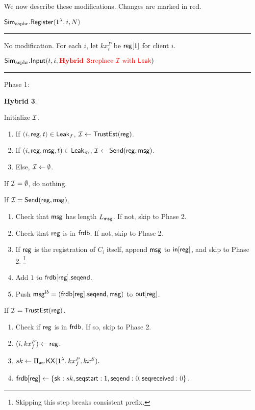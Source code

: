 We now describe these modifications. Changes are marked in red.

\vspace{10pt}

$\mathbf{\mathsf{Sim}_{\text{asphr}}.\mathsf{Register}}(1^{\lambda}, i, N)$
\vspace{5pt}
\hrule
\vspace{5pt}
No modification. For each $i$, let $kx^P_i$ be $\mathsf{reg}[1]$ for client $i$.
\vspace{10pt}

$\mathbf{\mathsf{Sim}_{\text{asphr}}.\mathsf{Input}}(t, i, {\color{red} \textbf{Hybrid 3:} \text{replace $\mathcal{I}$ with $\mathsf{Leak}$}})$
\vspace{5pt}
\hrule
\vspace{5pt}
Phase 1: 

{
\color{red} 

\textbf{Hybrid 3}:

Initialize $\mathcal{I}$.

\begin{enumerate}
    \item If $(i, \mathsf{reg}, t) \in \mathsf{Leak}_f$, $\mathcal{I} \leftarrow \mathsf{TrustEst}(\mathsf{reg})$.
    \item If $(i, \mathsf{reg}, \mathsf{msg}, t) \in \mathsf{Leak}_m$, $\mathcal{I} \leftarrow \mathsf{Send}(\mathsf{reg}, \mathsf{msg})$.
    \item Else, $\mathcal{I} \leftarrow \emptyset$.
\end{enumerate}

}

If $\mathcal{I} = \emptyset$, do nothing. 

If $\mathcal{I} = \mathsf{Send}(\mathsf{reg}, \mathsf{msg})$, 

\begin{enumerate}
    \item Check that $\mathsf{msg}$ has length $L_{\mathsf{msg}}$. If not, skip to Phase 2.
    \item Check that $\mathsf{reg}$ is in $\mathsf{frdb}$. If not, skip to Phase 2.
    \item If $\mathsf{reg}$ is the registration of $C_i$ itself, append $\mathsf{msg}$ to $\mathsf{in}[\mathsf{reg}]$, and skip to Phase 2. \footnote{Skipping this step breaks consistent prefix.}
    \item Add $1$ to $\mathsf{frdb}[\mathsf{reg}].\mathsf{seqend}$. 
    \item Push $\mathsf{msg}^{lb} = (\mathsf{frdb}[\mathsf{reg}].\mathsf{seqend}, \mathsf{msg})$ to $\mathsf{out}[\mathsf{reg}]$.
\end{enumerate}

If $\mathcal{I} = \mathsf{TrustEst}(\mathsf{reg})$.
\begin{enumerate}
    \item Check if $\mathsf{reg}$ is in $\mathsf{frdb}$. If so, skip to Phase 2.
    \item $(i, kx_f^P) \leftarrow \mathsf{reg}$.
    \item $sk \leftarrow \Pi_{\mathsf{ae}}.\mathsf{KX}(1^{\lambda}, kx_f^P, kx^S).$
    \item $\mathsf{frdb}[\mathsf{reg}] \leftarrow \{{\mathsf{sk}}: sk,  \mathsf{seqstart}: 1, \mathsf{seqend}: 0, \mathsf{seqreceived}: 0\}$.
\end{enumerate}

